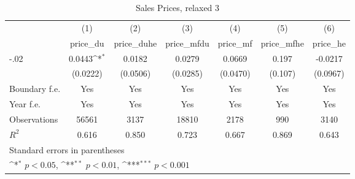 \begin{table}[htbp]\centering
\def\sym#1{\ifmmode^{#1}\else\(^{#1}\)\fi}
\caption{Sales Prices, relaxed 3}
\begin{tabular}{l*{6}{c}}
\hline\hline
                    &\multicolumn{1}{c}{(1)}&\multicolumn{1}{c}{(2)}&\multicolumn{1}{c}{(3)}&\multicolumn{1}{c}{(4)}&\multicolumn{1}{c}{(5)}&\multicolumn{1}{c}{(6)}\\
                    &\multicolumn{1}{c}{price\_du}&\multicolumn{1}{c}{price\_duhe}&\multicolumn{1}{c}{price\_mfdu}&\multicolumn{1}{c}{price\_mf}&\multicolumn{1}{c}{price\_mfhe}&\multicolumn{1}{c}{price\_he}\\
\hline
-.02                &      0.0443\sym{*}  &      0.0182         &      0.0279         &      0.0669         &       0.197         &     -0.0217         \\
                    &    (0.0222)         &    (0.0506)         &    (0.0285)         &    (0.0470)         &     (0.107)         &    (0.0967)         \\
[1em]
Boundary f.e.       &         Yes         &         Yes         &         Yes         &         Yes         &         Yes         &         Yes         \\
[1em]
Year f.e.           &         Yes         &         Yes         &         Yes         &         Yes         &         Yes         &         Yes         \\
\hline
Observations        &       56561         &        3137         &       18810         &        2178         &         990         &        3140         \\
\(R^{2}\)           &       0.616         &       0.850         &       0.723         &       0.667         &       0.869         &       0.643         \\
\hline\hline
\multicolumn{7}{l}{\footnotesize Standard errors in parentheses}\\
\multicolumn{7}{l}{\footnotesize \sym{*} \(p<0.05\), \sym{**} \(p<0.01\), \sym{***} \(p<0.001\)}\\
\end{tabular}
\end{table}
